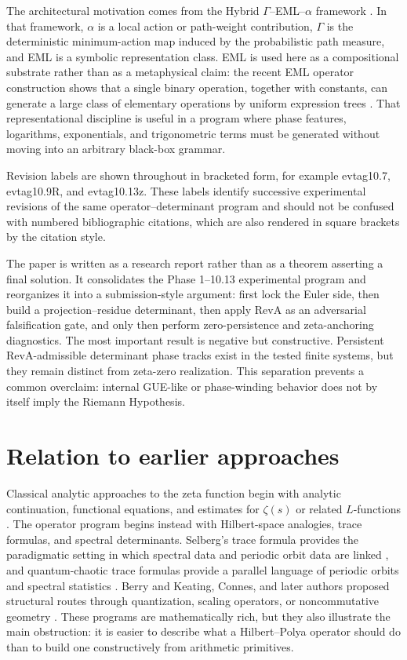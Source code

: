 \documentclass[11pt]{article}
\theoremstyle{definition}
\theoremstyle{plain}
\begin{document}
The architectural motivation comes from the Hybrid $\Gamma$--EML--$\alpha$ framework \citep{JoseHybridGammaEMLAlpha2026}.  In that framework, $\alpha$ is a local action or path-weight contribution, $\Gamma$ is the deterministic minimum-action map induced by the probabilistic path measure, and EML is a symbolic representation class.  EML is used here as a compositional substrate rather than as a metaphysical claim: the recent EML operator construction shows that a single binary operation, together with constants, can generate a large class of elementary operations by uniform expression trees \citep{Odrzywolek2026}.  That representational discipline is useful in a program where phase features, logarithms, exponentials, and trigonometric terms must be generated without moving into an arbitrary black-box grammar.

Revision labels are shown throughout in bracketed form, for example 
evtag{10.7}, 
evtag{10.9R}, and 
evtag{10.13z}.  These labels identify successive experimental revisions of the same operator--determinant program and should not be confused with numbered bibliographic citations, which are also rendered in square brackets by the citation style.

The paper is written as a research report rather than as a theorem asserting a final solution.  It consolidates the Phase 1--10.13 experimental program and reorganizes it into a submission-style argument: first lock the Euler side, then build a projection--residue determinant, then apply RevA as an adversarial falsification gate, and only then perform zero-persistence and zeta-anchoring diagnostics.  The most important result is negative but constructive.  Persistent RevA-admissible determinant phase tracks exist in the tested finite systems, but they remain distinct from zeta-zero realization.  This separation prevents a common overclaim: internal GUE-like or phase-winding behavior does not by itself imply the Riemann Hypothesis.

\section{Relation to earlier approaches}

Classical analytic approaches to the zeta function begin with analytic continuation, functional equations, and estimates for $\zeta(s)$ or related $L$-functions \citep{Edwards1974,Titchmarsh1986,Ivic1985}.  The operator program begins instead with Hilbert-space analogies, trace formulas, and spectral determinants.  Selberg's trace formula provides the paradigmatic setting in which spectral data and periodic orbit data are linked \citep{Selberg1956}, and quantum-chaotic trace formulas provide a parallel language of periodic orbits and spectral statistics \citep{Gutzwiller1990}.  Berry and Keating, Connes, and later authors proposed structural routes through quantization, scaling operators, or noncommutative geometry \citep{BerryKeating1999,Connes1999,Berry1985}.  These programs are mathematically rich, but they also illustrate the main obstruction: it is easier to describe what a Hilbert--Polya operator should do than to build one constructively from arithmetic primitives.
\end{document}
